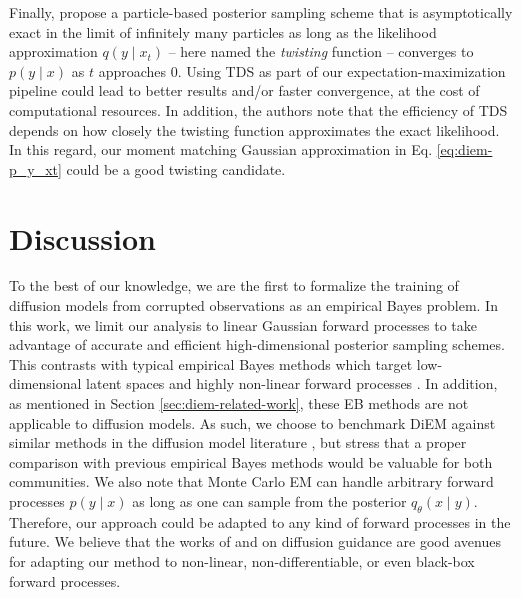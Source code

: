 Finally, \textcite{wu2023practical} propose a particle-based posterior sampling scheme that is asymptotically exact in the limit of infinitely many particles as long as the likelihood approximation $q(y \mid x_t)$ -- here named the \emph{twisting} function -- converges to $p(y \mid x)$ as $t$ approaches $0$. Using TDS \cite{wu2023practical} as part of our expectation-maximization pipeline could lead to better results and/or faster convergence, at the cost of computational resources. In addition, the authors note that the efficiency of TDS \cite{wu2023practical} depends on how closely the twisting function approximates the exact likelihood. In this regard, our moment matching Gaussian approximation in Eq. \eqref{eq:diem-p_y_xt} could be a good twisting candidate.

\section{Discussion} \label{sec:diem-discussion}

To the best of our knowledge, we are the first to formalize the training of diffusion models from corrupted observations as an empirical Bayes \cite{robbins1956empirical, casella1985introduction, carlin2000empirical, efron2014two} problem. In this work, we limit our analysis to linear Gaussian forward processes to take advantage of accurate and efficient high-dimensional posterior sampling schemes. This contrasts with typical empirical Bayes methods which target low-dimensional latent spaces and highly non-linear forward processes \cite{dockhorn2020density, andreassen2020omnifold, louppe2019adversarial, vandegar2021neural, vetter2024sourcerer}. In addition, as mentioned in Section \ref{sec:diem-related-work}, these EB methods are not applicable to diffusion models. As such, we choose to benchmark DiEM against similar methods in the diffusion model literature \cite{daras2023ambient, kawar2024gsurebased}, but stress that a proper comparison with previous empirical Bayes methods would be valuable for both communities. We also note that Monte Carlo EM \cite{wei1990monte, celeux1992stochastic, delyon1999convergence, booth1999maximizing, levine2001implementations, caffo2005ascentbased, jank2006em, ruth2024review} can handle arbitrary forward processes $p(y \mid x)$ as long as one can sample from the posterior $q_\theta(x \mid y)$. Therefore, our approach could be adapted to any kind of forward processes in the future. We believe that the works of \textcite{dhariwal2021diffusion} and \textcite{ho2022classifierfree} on diffusion guidance are good avenues for adapting our method to non-linear, non-differentiable, or even black-box forward processes.

